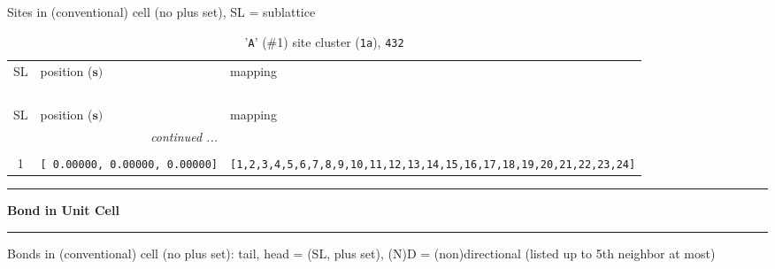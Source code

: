\documentclass[fleqn,10pt,landscape]{jsarticle}
\begin{document}
\noindent Sites in (conventional) cell (no plus set), SL = sublattice

\renewcommand{\arraystretch}{1.6}
\begin{longtable}[l]{cll}
\captionsetup{justification=raggedright, singlelinecheck=off}
\caption{'\texttt{A}' (\#1) site cluster (\texttt{1a}), \texttt{432}}
 \\
 \hline \hline
SL & position ($\bm{s})$ & mapping \\ \hline \endfirsthead

\multicolumn{2}{l}{\tablename\ \thetable{}} \\
 \hline \hline
SL & position ($\bm{s})$ & mapping \\ \hline \endhead

 \hline \hline
\multicolumn{2}{r}{\footnotesize\it continued ...} \\ \endfoot

 \hline \hline
\multicolumn{2}{r}{} \\ \endlastfoot

1 & \texttt{[ 0.00000, 0.00000, 0.00000]} & \texttt{[1,2,3,4,5,6,7,8,9,10,11,12,13,14,15,16,17,18,19,20,21,22,23,24]} \\
\end{longtable}
\vspace{5mm}
\noindent \rule[0.5mm]{5mm}{0.5mm}\hspace{3mm}\textbf{Bond in Unit Cell}\hspace{3mm}\leaders\hrule height 0.5mm\hfill\kern0pt
\vspace{3mm}

\noindent Bonds in (conventional) cell (no plus set): tail, head = (SL, plus set), (N)D = (non)directional (listed up to 5th neighbor at most)
\end{document}
